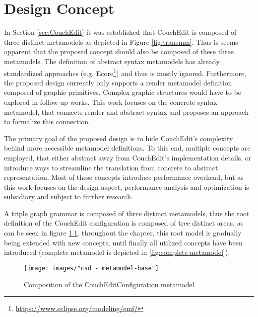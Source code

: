 \chapter{Design Concept}
\label{chap:design}
In Section \ref{sec:CouchEdit} it was established that CouchEdit is composed of three distinct metamodels as depicted in Figure \ref{fig:transmm}. Thus is seems apparent that the proposed concept should also be composed of these three metamodels. The definition of abstract syntax metamodels has already standardized approaches (e.g. Ecore\footnote{\url{https://www.eclipse.org/modeling/emf/}}) and thus is mostly ignored. Furthermore, the proposed design currently only supports a render metamodel definition composed of graphic primitives. Complex graphic structures would have to be explored in follow up works. This work focuses on the concrete syntax metamodel, that connects render and abstract syntax and proposes an approach to formalize this connection.

The primary goal of the proposed design is to hide CouchEdit's complexity behind more accessible metamodel definitions. To this end, multiple concepts are employed, that either abstract away from CouchEdit's implementation details, or introduce ways to streamline the translation from concrete to abstract representation. Most of these concepts introduce performance overhead, but as this work focuses on the design aspect, performance analysis and optimization is subsidiary and subject to further research.



A triple graph grammar is composed of three distinct metamodels, thus the root definition of the CouchEdit configuration is composed of tree distinct areas, as can be seen in figure \ref{fig:metamodel-base}. throughout the chapter, this root model is gradually being extended with new concepts, until finally all utilized concepts have been introduced (complete metamodel is depicted in \ref{fig:complete-metamodel}).

\begin{figure}
  \centering
  \texttt{[image: images/"csd - metamodel-base"]}
  \caption{Composition of the CouchEditConfiguration metamodel}
  \label{fig:metamodel-base}
\end{figure}

